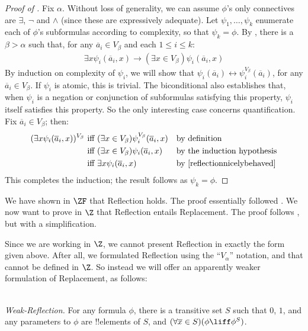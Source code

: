 \documentclass[../../../include/open-logic-section]{subfiles}
\begin{document}
\begin{proof}[Proof of ] 
Fix $\alpha$. Without loss of generality, we can assume $\phi$'s only
connectives are $\exists$, $\lnot$ and $\land$ (since these are
expressively adequate). Let $\psi_1, \ldots, \psi_k$ enumerate each of
$\phi$'s subformulas according to complexity, so that $\psi_k = \phi$.
By , there is a $\beta > \alpha$ such that, for
any $\overline{a}_i \in V_\beta$ and each $1 \leq i \leq k$:
\begin{align}\label{reflectionnicelybehaved}
	\exists x\psi_i(\overline{a}_i, x) \rightarrow 
	(\exists x \in V_\beta) \psi_i(\overline{a}_i, x)\tag{*}
\end{align}
By induction on complexity of $\psi_i$, we will show that
$\psi_i(\overline{a}_i) \leftrightarrow
\psi_i^{V_\beta}(\overline{a}_i)$, for any  $\overline{a}_i \in
V_\beta$. 	If $\psi_i$ is atomic, this is trivial. The biconditional
also establishes that, when $\psi_i$ is a negation or conjunction of
subformulas satisfying this property, $\psi_i$ itself satisfies this
property. So the only interesting case concerns quantification. Fix
$\overline{a}_i \in V_\beta$; then:
\begin{align*}
	(\exists x \psi_i(\overline{a}_i, x))^{V_\beta}
	&\text{ iff }
	(\exists x \in V_\beta)\psi_i^{V_\beta}(\overline{a}_i, x)
	&&\text{by definition}\\
	&\text{ iff }
	(\exists x \in V_\beta)\psi_i(\overline{a}_i,  x)
	&&\text{by the induction hypothesis}\\
	&\text{ iff }
	\exists x \psi_i(\overline{a}_i, x)
	&&\text{by \eqref{reflectionnicelybehaved}}
\end{align*}
This completes the induction; the result follows as $\psi_k = \phi$.
\end{proof}

We have shown in $\ZF$ that Reflection holds. The proof essentially
followed \citet{Montague1961}. We now want to prove in $\Z$ that
Reflection entails Replacement. The proof follows \citet{Levy1960},
but with a simplification. 

Since we are working in $\Z$, we cannot present Reflection in exactly
the form given above. After all, we formulated Reflection using the
``$V_\alpha$'' notation, and that cannot be defined in $\Z$. So
instead we will offer an apparently weaker formulation of Replacement,
as follows:

\ \\\emph{Weak-Reflection.} For any formula $\phi$, there is a
transitive set $S$ such that $0$, $1$, and any parameters to $\phi$
are !!{element}s of $S$, and $(\forall \overline{x} \in S)(\phi \liff
\phi^S)$.
\end{document}
